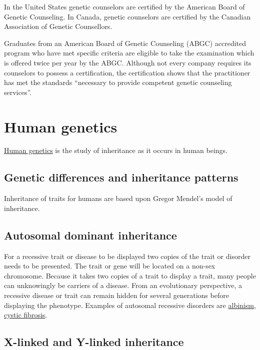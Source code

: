 In the United States genetic counselors are certified by the American Board of Genetic Counseling. In Canada, genetic counselors are certified by the Canadian Association of Genetic Counsellors.

Graduates from an American Board of Genetic Counseling (ABGC) accredited program who have met specific criteria are eligible to take the examination which is offered twice per year by the ABGC. Although not every company requires its counselors to possess a certification, the certification shows that the practitioner has met the standards ``necessary to provide competent genetic counseling services''.

\hypertarget{human-genetics}{%
\section{Human genetics}\label{human-genetics}}

\href{https://en.wikipedia.org/wiki/Human_genetics}{Human genetics} is the study of inheritance as it occurs in human beings.

\hypertarget{genetic-differences-and-inheritance-patterns}{%
\subsection{Genetic differences and inheritance patterns}\label{genetic-differences-and-inheritance-patterns}}

Inheritance of traits for humans are based upon Gregor Mendel's model of inheritance.

\hypertarget{autosomal-dominant-inheritance}{%
\subsection{Autosomal dominant inheritance}\label{autosomal-dominant-inheritance}}

For a recessive trait or disease to be displayed two copies of the trait or disorder needs to be presented. The trait or gene will be located on a non-sex chromosome. Because it takes two copies of a trait to display a trait, many people can unknowingly be carriers of a disease. From an evolutionary perspective, a recessive disease or trait can remain hidden for several generations before displaying the phenotype. Examples of autosomal recessive disorders are \href{https://en.wikipedia.org/wiki/Albinism}{albinism}, \href{https://en.wikipedia.org/wiki/Cystic_fibrosis}{cystic fibrosis}.

\hypertarget{x-linked-and-y-linked-inheritance}{%
\subsection{X-linked and Y-linked inheritance}\label{x-linked-and-y-linked-inheritance}}

